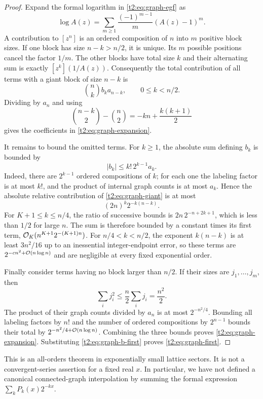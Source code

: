 \documentclass[11pt,openany]{book}
\numberwithin{equation}{chapter}
\theoremstyle{plain}
\theoremstyle{definition}
\theoremstyle{remark}
\begin{document}
\begin{proof}
Expand the formal logarithm in \eqref{t2:eq:graph-egf} as
\[
 \log A(z)=\sum_{m\ge1}\frac{(-1)^{m-1}}m(A(z)-1)^m.
\]
A contribution to $[z^n]$ is an ordered composition of $n$ into $m$ positive block sizes. If one block has size $n-k>n/2$, it is unique. Its $m$ possible positions cancel the factor $1/m$. The other blocks have total size $k$ and their alternating sum is exactly $[z^k](1/A(z))$. Consequently the total contribution of all terms with a giant block of size $n-k$ is
\begin{equation}
 \binom nk b_k a_{n-k},\qquad 0\le k<n/2.
 \label{t2:eq:graph-giant}
\end{equation}
Dividing by $a_n$ and using
\[
 \binom{n-k}{2}-\binom n2=-kn+\frac{k(k+1)}2
\]
gives the coefficients in \eqref{t2:eq:graph-expansion}.

It remains to bound the omitted terms. For $k\ge1$, the absolute sum defining $b_k$ is bounded by
\[
 |b_k|\le k!\,2^{k-1}a_k.
\]
Indeed, there are $2^{k-1}$ ordered compositions of $k$; for each one the labeling factor is at most $k!$, and the product of internal graph counts is at most $a_k$. Hence the absolute relative contribution of \eqref{t2:eq:graph-giant} is at most
\begin{equation}
 (2n)^k2^{-k(n-k)}.
 \label{t2:eq:graph-tail-bound}
\end{equation}
For $K+1\le k\le n/4$, the ratio of successive bounds is
$2n\,2^{-n+2k+1}$, which is less than $1/2$ for large $n$. The sum is therefore bounded by a constant times its first term,
$\mathcal O_K(n^{K+1}2^{-(K+1)n})$. For $n/4<k<n/2$, the exponent $k(n-k)$ is at least $3n^2/16$ up to an inessential integer-endpoint error, so these terms are $2^{-c n^2+\mathcal O(n\log n)}$ and are negligible at every fixed exponential order.

Finally consider terms having no block larger than $n/2$. If their sizes are $j_1,\ldots,j_m$, then
\[
 \sum_i j_i^2\le\frac n2\sum_i j_i=\frac{n^2}2.
\]
The product of their graph counts divided by $a_n$ is at most $2^{-n^2/4}$. Bounding all labeling factors by $n!$ and the number of ordered compositions by $2^{n-1}$ bounds their total by
$2^{-n^2/4+\mathcal O(n\log n)}$. Combining the three bounds proves \eqref{t2:eq:graph-expansion}. Substituting \eqref{t2:eq:graph-b-first} proves \eqref{t2:eq:graph-first}.
\end{proof}

This is an all-orders theorem in exponentially small lattice sectors. It is not a convergent-series assertion for a fixed real $x$. In particular, we have not defined a canonical connected-graph interpolation by summing the formal expression $\sum_kP_k(x)2^{-kx}$.
\end{document}
